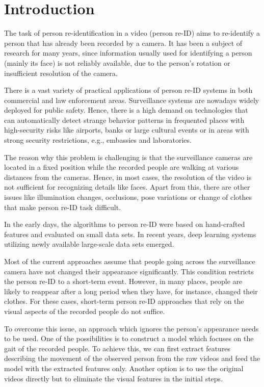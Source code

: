 \chapter{Introduction}

The task of person re-identification in a video (person re-ID) aims to re-identify a person that has already been recorded by a camera. It has been a subject of research for many years, since information usually used for identifying a person (mainly its face) is not reliably available, due to the person's rotation or insufficient resolution of the camera.

There is a vast variety of practical applications of person re-ID systems in both commercial and law enforcement areas. Surveillance systems are nowadays widely deployed for public safety. Hence, there is a high demand on technologies that can automatically detect strange behavior patterns in frequented places with high-security risks like airports, banks or large cultural events or in areas with strong security restrictions, e.g., embassies and laboratories.

The reason why this problem is challenging is that the surveillance cameras are located in a fixed position while the recorded people are walking at various distances from the cameras. Hence, in most cases, the resolution of the video is not sufficient for recognizing details like faces. Apart from this, there are other issues like illumination changes, occlusions, pose variations or change of clothes that make person re-ID task difficult.

In the early days, the algorithms to person re-ID were based on hand-crafted features and evaluated on small data sets. In recent years, deep learning systems utilizing newly available large-scale data sets emerged.    

Most of the current approaches assume that people going across the surveillance camera have not changed their appearance significantly. This condition restricts the person re-ID to a short-term event. However, in many places, people are likely to reappear after a long period when they have, for instance, changed their clothes. For these cases, short-term person re-ID approaches that rely on the visual aspects of the recorded people do not suffice.

To overcome this issue, an approach which ignores the person's appearance needs to be used. One of the possibilities is to construct a model which focuses on the gait of the recorded people. To achieve this, we can first extract features describing the movement of the observed person from the raw videos and feed the model with the extracted features only. Another option is to use the original videos directly but to eliminate the visual features in the initial steps. 

